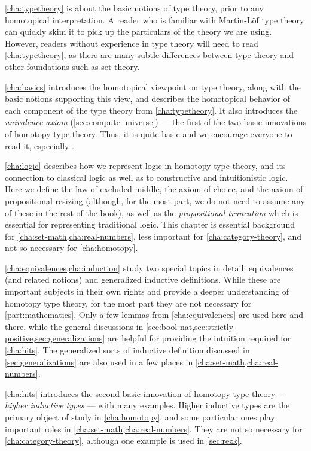 \autoref{cha:typetheory} is about the basic notions of type theory, prior to any homotopical interpretation.
A reader who is familiar with Martin-L\"of type theory can quickly skim it to pick up the particulars of the theory we are using.
However, readers without experience in type theory will need to read \autoref{cha:typetheory}, as there are many subtle differences between type theory and other foundations such as set theory.

\autoref{cha:basics} introduces the homotopical viewpoint on type theory, along with the basic notions supporting this view, and describes the homotopical behavior of each component of the type theory from \autoref{cha:typetheory}.
It also introduces the \emph{univalence axiom} (\autoref{sec:compute-universe}) --- the first of the two basic innovations of homotopy type theory.
Thus, it is quite basic and we encourage everyone to read it, especially .

\autoref{cha:logic} describes how we represent logic in homotopy type theory, and its connection to classical logic as well as to constructive and intuitionistic logic.
Here we define the law of excluded middle, the axiom of choice, and the axiom of propositional resizing (although, for the most part, we do not need to assume any of these in the rest of the book), as well as the \emph{propositional truncation} which is essential for representing traditional logic.
This chapter is essential background for \autoref{cha:set-math,cha:real-numbers}, less important for \autoref{cha:category-theory}, and not so necessary for \autoref{cha:homotopy}.

\autoref{cha:equivalences,cha:induction} study two special topics in detail: equivalences (and related notions) and generalized inductive definitions.
While these are important subjects in their own rights and provide a deeper understanding of homotopy type theory, for the most part they are not necessary for \autoref{part:mathematics}.
Only a few lemmas from \autoref{cha:equivalences} are used here and there, while the general discussions in \autoref{sec:bool-nat,sec:strictly-positive,sec:generalizations} are helpful for providing the intuition required for \autoref{cha:hits}.
The generalized sorts of inductive definition discussed in \autoref{sec:generalizations} are also used in a few places in \autoref{cha:set-math,cha:real-numbers}.

\autoref{cha:hits} introduces the second basic innovation of homotopy type theory --- \emph{higher inductive types} --- with many examples.
Higher inductive types are the primary object of study in \autoref{cha:homotopy}, and some particular ones play important roles in \autoref{cha:set-math,cha:real-numbers}.
They are not so necessary for \autoref{cha:category-theory}, although one example is used in \autoref{sec:rezk}.

